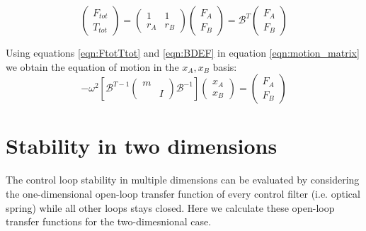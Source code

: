 \begin{equation}
\label{eqn:FtotTtot}
\begin{pmatrix}
F_{tot} \\ T_{tot}
\end{pmatrix}
=
 \begin{pmatrix}
1& 1\\r_A& r_B
\end{pmatrix} 
\begin{pmatrix}
F_A\\ F_B
\end{pmatrix}
=
\mathcal{B}^{T}
\begin{pmatrix}
F_A\\ F_B
\end{pmatrix}
\end{equation}

Using equations \ref{eqn:FtotTtot} and \ref{eqn:BDEF} in equation \ref{eqn:motion_matrix} we obtain the equation of motion in the ${x_A,x_B}$ basis:
\begin{equation}
-\omega^2
\left[
\mathcal{B}^{T-1}
\begin{pmatrix}
m &  \\ & I
\end{pmatrix}
\mathcal{B}^{-1}
\right ]
 \begin{pmatrix}
x_A\\ x_B
\end{pmatrix} 
=
\begin{pmatrix}
F_{A}\\ F_{B}
\end{pmatrix}
\end{equation}

\section{Stability in two dimensions}
\label{app:C}
The control loop stability in multiple dimensions can be evaluated by considering the one-dimensional open-loop transfer function of every control filter (i.e. optical spring) while all other loops stays closed. Here we calculate these open-loop transfer functions for the two-dimesnional case.

